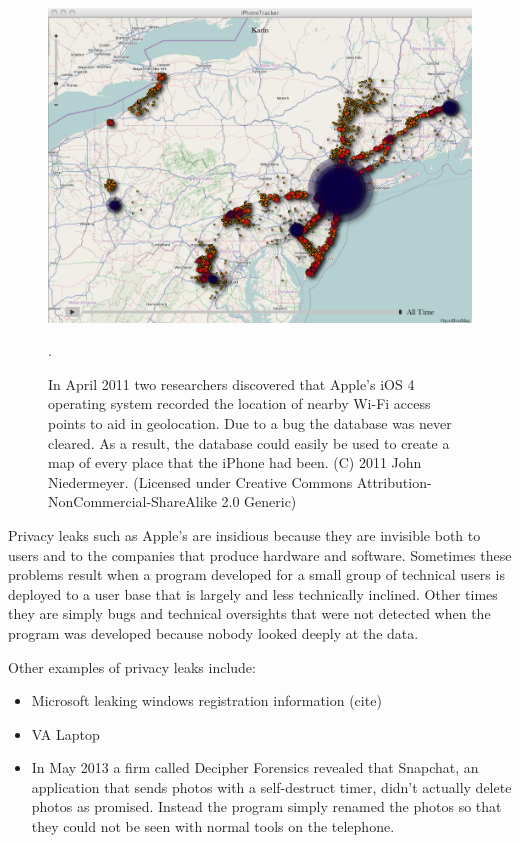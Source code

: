 \begin{figure}
\includegraphics[width=\textwidth]{ch-1/5637893141_ba59f2d989_o.png}
\caption{In April 2011 two researchers discovered that Apple's iOS 4
  operating system recorded the location of nearby Wi-Fi access points
  to aid in geolocation. Due to a bug the database was never
  cleared. As a result, the database could easily be used to create a
  map of every place that the iPhone had been. (C) 2011 John
  Niedermeyer. {\small (Licensed under Creative Commons
  Attribution-NonCommercial-ShareAlike 2.0 Generic)}}.\label{heatmap}
\end{figure}

Privacy leaks such as Apple's are insidious because they are
invisible both to users and to the companies that produce
hardware and software. Sometimes these problems result when a program
developed for a small group of technical users is deployed to a user
base that is largely and less technically inclined. Other times they
are simply bugs and technical oversights that were not detected when
the program was developed because nobody looked deeply at the data. 

Other examples of privacy leaks include:
\begin{itemize}
\item Microsoft leaking windows registration information (cite)
\item VA Laptop
\item In May 2013 a firm called Decipher Forensics revealed that Snapchat, an application that sends photos with a
  self-destruct timer, didn't actually delete photos as
  promised. Instead the program simply renamed the photos so that they
  could not be seen with normal tools on the telephone\cite{ksl-snap-chat}.
\end{itemize}

